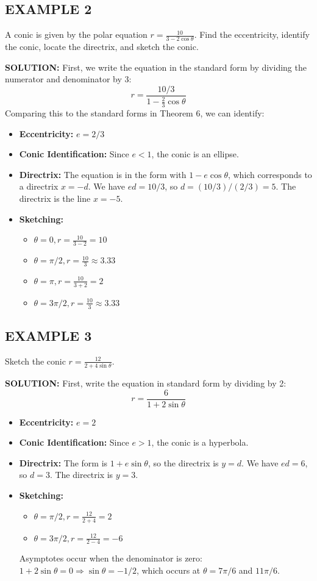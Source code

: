 \documentclass{article}
\begin{document}
\subsection*{EXAMPLE 2}
A conic is given by the polar equation $r = \frac{10}{3 - 2 \cos\theta}$. Find the eccentricity, identify the conic, locate the directrix, and sketch the conic.

\textbf{SOLUTION:}
First, we write the equation in the standard form by dividing the numerator and denominator by 3:
\[
r = \frac{10/3}{1 - \frac{2}{3} \cos\theta}
\]
Comparing this to the standard forms in Theorem 6, we can identify:
\begin{itemize}
    \item \textbf{Eccentricity:} $e = 2/3$
    \item \textbf{Conic Identification:} Since $e < 1$, the conic is an ellipse.
    \item \textbf{Directrix:} The equation is in the form with $1 - e \cos\theta$, which corresponds to a directrix $x = -d$. We have $ed = 10/3$, so $d = (10/3) / (2/3) = 5$. The directrix is the line $x = -5$.
    \item \textbf{Sketching:}
        \begin{itemize}
            \item $\theta = 0, r = \frac{10}{3-2} = 10$
            \item $\theta = \pi/2, r = \frac{10}{3} \approx 3.33$
            \item $\theta = \pi, r = \frac{10}{3+2} = 2$
            \item $\theta = 3\pi/2, r = \frac{10}{3} \approx 3.33$
        \end{itemize}
\end{itemize}

\subsection*{EXAMPLE 3}
Sketch the conic $r = \frac{12}{2 + 4 \sin\theta}$.

\textbf{SOLUTION:}
First, write the equation in standard form by dividing by 2:
\[
r = \frac{6}{1 + 2 \sin\theta}
\]
\begin{itemize}
    \item \textbf{Eccentricity:} $e = 2$
    \item \textbf{Conic Identification:} Since $e > 1$, the conic is a hyperbola.
    \item \textbf{Directrix:} The form is $1 + e \sin\theta$, so the directrix is $y = d$. We have $ed = 6$, so $d = 3$. The directrix is $y = 3$.
    \item \textbf{Sketching:}
        \begin{itemize}
            \item $\theta = \pi/2, r = \frac{12}{2+4} = 2$
            \item $\theta = 3\pi/2, r = \frac{12}{2-4} = -6$
        \end{itemize}
    Asymptotes occur when the denominator is zero: $1 + 2 \sin\theta = 0 \Rightarrow \sin\theta = -1/2$, which occurs at $\theta = 7\pi/6$ and $11\pi/6$.
\end{itemize}
\end{document}
